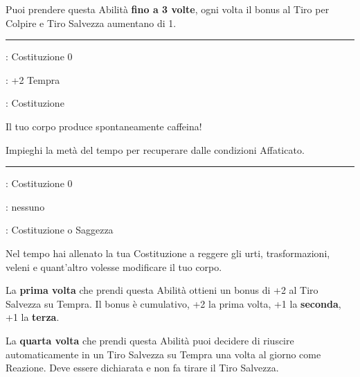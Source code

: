 \begin{multicols}{2}
Puoi prendere questa Abilità \textbf{fino a 3 volte}, ogni volta il bonus al Tiro per Colpire e Tiro Salvezza aumentano di 1.

\smallskip\noindent\rule{\linewidth}{2pt} \hypertarget{Recupero}{}\medskip{}
\noindent
\begin{description}[noitemsep, topsep=0pt, parsep=0pt, partopsep=0pt, leftmargin=0cm, labelwidth=2.5cm]
    \item[\textbf{Requisito}]: Costituzione 0
    \item[\textbf{Tiri Salvezza}]: +2 Tempra
    \item[\textbf{Caratteristica}]: Costituzione
\end{description}

Il tuo corpo produce spontaneamente caffeina!

Impieghi la metà del tempo per recuperare dalle condizioni Affaticato.

\smallskip\noindent\rule{\linewidth}{2pt} \hypertarget{Resistenza della pietra}{}\medskip{}
\noindent
\begin{description}[noitemsep, topsep=0pt, parsep=0pt, partopsep=0pt, leftmargin=0cm, labelwidth=2.5cm]
    \item[\textbf{Requisito}]: Costituzione 0
    \item[\textbf{Tiri Salvezza}]: nessuno
    \item[\textbf{Caratteristica}]: Costituzione o Saggezza
\end{description}

Nel tempo hai allenato la tua Costituzione a reggere gli urti, trasformazioni, veleni e quant'altro volesse modificare il tuo corpo.

La \textbf{prima volta} che prendi questa Abilità ottieni un bonus di +2 al Tiro Salvezza su Tempra. Il bonus è cumulativo, +2 la prima volta, +1 la \textbf{seconda}, +1 la \textbf{terza}.

La \textbf{quarta volta} che prendi questa Abilità puoi decidere di riuscire automaticamente in un Tiro Salvezza su Tempra una volta al giorno come Reazione. Deve essere dichiarata e non fa tirare il Tiro Salvezza.


\end{multicols}
